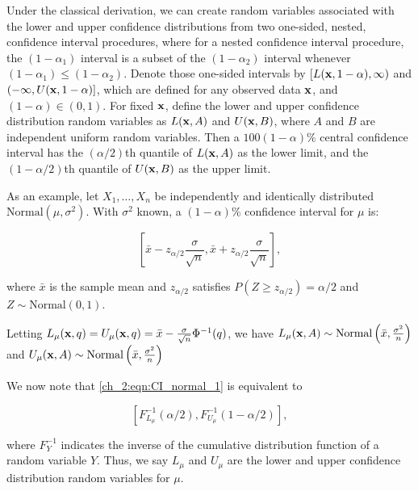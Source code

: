 Under the classical derivation, we can create random variables associated with the lower and upper confidence distributions from two one-sided, nested, confidence interval procedures, where for a nested confidence interval procedure, the $(1-\alpha_1)$ interval is a subset of the $(1-\alpha_2)$ interval whenever $(1-\alpha_1) \leq (1-\alpha_2)$.
Denote those one-sided intervals by $[L({\bf x},1-\alpha), \infty)$ and $(-\infty, U({\bf x},1-\alpha)]$, which are defined for any observed data ${\bf x}$, and $(1-\alpha) \in (0,1)$.
For fixed ${\bf x}$, define the lower and upper confidence distribution random variables as $L({\bf x}, A)$ and $U({\bf x},B)$, where $A$ and $B$ are independent uniform random variables.
Then a $100(1-\alpha)\%$ central confidence interval has the $(\alpha/2)$th quantile of $L({\bf x}, A)$ as the lower limit, and the $(1-\alpha/2)$th quantile of $U({\bf x},B)$ as the upper limit.

As an example, let \( X_1, \ldots, X_n \) be independently and identically distributed \( \textrm{Normal}(\mu, \sigma^2) \).
With \( \sigma^2 \) known, a \( (1 - \alpha) \)\% confidence interval for \( \mu \) is:

\begin{equation}
\left[ \bar{x} - z_{\alpha/2} \frac{\sigma}{\sqrt{n}}, \bar{x} + z_{\alpha/2} \frac{\sigma}{\sqrt{n}} \right],
\label{ch_2:eqn:CI_normal_1}
\end{equation}

where \( \bar{x} \) is the sample mean and \( z_{\alpha / 2} \) satisfies \( P(Z \geq z_{\alpha / 2}) = \alpha / 2 \) and \( Z \sim \textrm{Normal}(0,1) \).

Letting \( L_\mu (\mathbf{x}, q) = U_\mu (\mathbf{x}, q) = \bar{x} - \frac{\sigma}{\sqrt{n}} \Phi^{-1}(q) \), we have \( L_\mu(\mathbf{x}, A) \sim \textrm{Normal} \left( \bar{x}, \frac{\sigma^2}{n} \right) \) and \( U_\mu(\mathbf{x}, A) \sim \textrm{Normal} \left( \bar{x}, \frac{\sigma^2}{n} \right) \)

We now note that \eqref{ch_2:eqn:CI_normal_1} is equivalent to

\begin{equation}
    \left[ F_{L_{\mu}}^{-1}(\alpha / 2), F_{U_{\mu}}^{-1}(1- \alpha / 2) \right],
\end{equation}

where \( F_Y^{-1} \) indicates the inverse of the cumulative distribution function of a random variable \( Y \).
Thus, we say \( L_\mu \) and \( U_\mu \) are the lower and upper confidence distribution random variables for \( \mu \).

